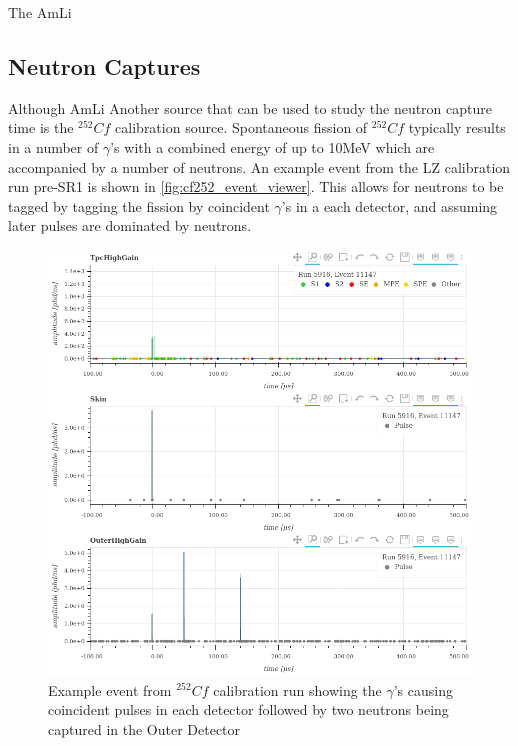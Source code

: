 \par
The AmLi 




\subsection{Neutron Captures}
\par
Although AmLi 
Another source that can be used to study the neutron capture time is the ${}^{252}{Cf}$ calibration source.
Spontaneous fission of ${}^{252}{Cf}$ typically results in a number of $\gamma$'s with a combined energy of up to 10MeV which are accompanied by a number of neutrons.
An example event from the LZ calibration run pre-SR1 is shown in \autoref{fig:cf252_event_viewer}.
This allows for neutrons to be tagged by tagging the fission by coincident $\gamma$'s in a each detector, and assuming later pulses are dominated by neutrons.

\begin{figure}[!htbp]
\includegraphics[width=\textwidth]{Figures/NeutronCaptureTime/cf252_eventviewer_5916.png}
\centering
\caption{Example event from ${}^{252}{Cf}$ calibration run showing the $\gamma$'s causing coincident pulses in each detector followed by two neutrons being captured in the Outer Detector}
\label{fig:cf252_event_viewer}
\end{figure}


